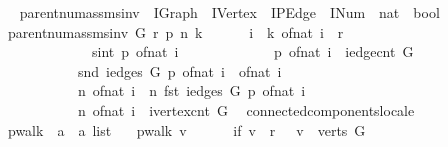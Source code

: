 \begin{isabellebody}
\isanewline
{}\isamarkupfalse%
\ \isanewline
\ \ parent{\isacharunderscore}num{\isacharunderscore}assms{\isacharunderscore}inv\ {\isacharcolon}{\isacharcolon}\ {\isachardoublequoteopen}IGraph\ {\isasymRightarrow}\ IVertex\ {\isasymRightarrow}\ IPEdge\ {\isasymRightarrow}\ INum\ {\isasymRightarrow}\ nat\ {\isasymRightarrow}\ bool{\isachardoublequoteclose}\ \isanewline
{}\isanewline
\ \ {\isachardoublequoteopen}parent{\isacharunderscore}num{\isacharunderscore}assms{\isacharunderscore}inv\ G\ r\ p\ n\ k\ {\isasymequiv}\ \isanewline
\ \ \ \ {\isasymforall}i\ {\isacharless}\ k{\isachardot}\ {\isacharparenleft}of{\isacharunderscore}nat\ i{\isacharparenright}\ {\isasymnoteq}\ r\ {\isasymlongrightarrow}\ \isanewline
\ \ \ \ \ \ \ \ \ \ \ \ {}\ {\isasymle}\ sint\ {\isacharparenleft}p\ {\isacharparenleft}of{\isacharunderscore}nat\ i{\isacharparenright}{\isacharparenright}\ {\isasymand}\isanewline
\ \ \ \ \ \ \ \ \ \ \ \ {\isacharparenleft}{\isacharparenleft}p\ {\isacharparenleft}of{\isacharunderscore}nat\ i{\isacharparenright}{\isacharparenright}\ {\isacharless}\ iedge{\isacharunderscore}cnt\ G\ {\isasymand}\isanewline
\ \ \ \ \ \ \ \ \ \ \ \ snd\ {\isacharparenleft}iedges\ G\ {\isacharparenleft}p\ {\isacharparenleft}of{\isacharunderscore}nat\ i{\isacharparenright}{\isacharparenright}{\isacharparenright}\ {\isacharequal}\ {\isacharparenleft}of{\isacharunderscore}nat\ i{\isacharparenright}\ {\isasymand}\ \isanewline
\ \ \ \ \ \ \ \ \ \ \ \ n\ {\isacharparenleft}of{\isacharunderscore}nat\ i{\isacharparenright}\ {\isacharequal}\ n\ {\isacharparenleft}fst\ {\isacharparenleft}iedges\ G\ {\isacharparenleft}p\ {\isacharparenleft}of{\isacharunderscore}nat\ i{\isacharparenright}{\isacharparenright}{\isacharparenright}{\isacharparenright}\ {\isacharplus}\ {}{\isacharparenright}\ {\isasymand}\isanewline
\ \ \ \ \ \ \ \ \ \ \ \ n\ {\isacharparenleft}of{\isacharunderscore}nat\ i{\isacharparenright}\ {\isacharless}\ ivertex{\isacharunderscore}cnt\ G{\isachardoublequoteclose}\isanewline
\isanewline
{}\isamarkupfalse%
\ {\isacharparenleft}\ connected{\isacharunderscore}components{\isacharunderscore}locale{\isacharparenright}\ \isanewline
\ \ pwalk\ {\isacharcolon}{\isacharcolon}\ {\isachardoublequoteopen}{\isacharprime}a\ {\isasymRightarrow}\ {\isacharprime}a\ list{\isachardoublequoteclose}\ \isanewline
{}\isanewline
\ \ {\isachardoublequoteopen}pwalk\ v\ {\isacharequal}\ \isanewline
\ \ \ \ {\isacharparenleft}if\ {\isacharparenleft}v\ {\isacharequal}\ r\ \ {\isasymor}\ v\ {\isasymnotin}\ verts\ G{\isacharparenright}\isanewline

\end{isabellebody}
